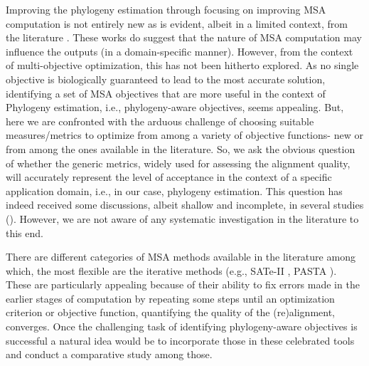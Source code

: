 Improving the phylogeny estimation through focusing on improving MSA computation is not entirely new as is evident, albeit in a limited context, from the literature \cite{redelings2005joint, ashkenazy2018multiple, warnow2013large}. These works do suggest that the nature of MSA computation may influence the outputs (in a domain-specific manner). However, from the context of multi-objective optimization, this has not been hitherto explored. As no single objective is biologically guaranteed to lead to the most accurate solution, identifying a set of MSA objectives that are more useful in the context of Phylogeny estimation, i.e., phylogeny-aware objectives, seems appealing. But, here we are confronted with the arduous challenge of choosing suitable measures/metrics to optimize from among a variety of objective functions- new or from among the ones available in the literature. So, we ask the obvious question of whether the generic metrics, widely used for assessing the alignment quality, will accurately represent the level of acceptance in the context of a specific application domain, i.e., in our case, phylogeny estimation. This question has indeed received some discussions, albeit shallow and incomplete, in several studies (\cite{mirarab2015pasta, liu2009rapid}). However, we are not aware of any systematic investigation in the literature to this end.

There are different categories of MSA methods available in the literature among which, the most flexible are the iterative methods (e.g., SATe-II \cite{liu2012sate}, PASTA \cite{mirarab2015pasta}). These are particularly appealing because of their ability to fix errors made in the earlier stages of computation by repeating some steps until an optimization criterion or objective function, quantifying the quality of the (re)alignment, converges. Once the challenging task of identifying phylogeny-aware objectives is successful a natural idea would be to incorporate those in these celebrated tools and conduct a comparative study among those.    

